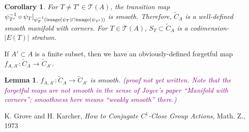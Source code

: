 \documentclass[11pt]{article}
\newtheorem{lmm}[thm]{Lemma}
\newtheorem{crl}[thm]{Corollary}
\theoremstyle{definition}
\theoremstyle{remark}
\def\wt#1{\widetilde{#1}}
\def\cT{\mathcal{T}}
\def\cmt#1{\textcolor{purple}{(#1)}}
\def\tn#1{\textnormal{#1}}
\begin{document}
\begin{crl}
For $T\neq T'\in \cT(A)$, the transition map $\psi_{T'}^{-1}\circ\psi_{T}|_{\psi_T^{-1}(\tn{image}(\psi_T)\cap\tn{image}(\psi_{T'}))}$ is smooth. 
Therefore, $\wt{C}_A$ is a well-defined smooth manifold with corners. For $T\in\cT(A)$, $S_T\subset \wt{C}_A$ is a codimension-$|E(T)|$ stratum. 
\end{crl}

If $A'\subset A$ is a finite subset, then we have an obviously-defined forgetful map $f_{A,A'}:\wt{C}_A\to\wt{C}_{A'}$. 

\begin{lmm}
$f_{A,A'}:\wt{C}_A\to\wt{C}_{A'}$ is smooth. \cmt{proof not yet written. Note that the forgetful maps are not smooth in the sense of Joyce's paper ``Manifold with corners''; smoothness here means ``weakly smooth'' there.}
\end{lmm}


\begin{thebibliography}{9}
 K. Grove and H. Karcher, {\it How to Conjugate $C^1$-Close Group Actions}, Math. Z., 1973
\end{thebibliography}
\end{document}

